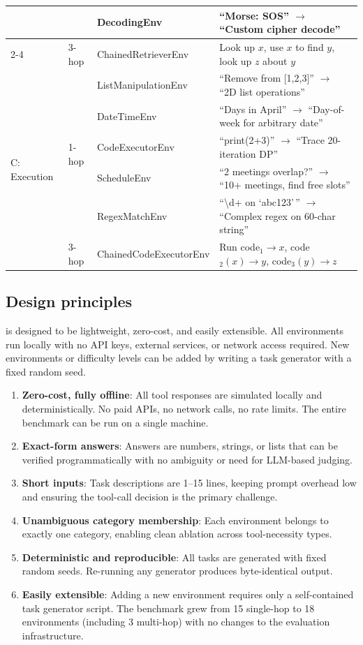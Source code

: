 \begin{table}[H]
\begin{tabular}{lllp{6.5cm}}
  & & DecodingEnv & ``Morse: SOS'' $\to$ ``Custom cipher decode'' \\
  \cmidrule(lr){2-4}
  & 3-hop & ChainedRetrieverEnv & Look up $x$, use $x$ to find $y$, look up $z$ about $y$ \\
\midrule
\multirow{6}{*}{C: Execution}
  & \multirow{5}{*}{1-hop} & ListManipulationEnv & ``Remove from [1,2,3]'' $\to$ ``2D list operations'' \\
  & & DateTimeEnv & ``Days in April'' $\to$ ``Day-of-week for arbitrary date'' \\
  & & CodeExecutorEnv & ``print(2+3)'' $\to$ ``Trace 20-iteration DP'' \\
  & & ScheduleEnv & ``2 meetings overlap?'' $\to$ ``10+ meetings, find free slots'' \\
  & & RegexMatchEnv & ``\textbackslash d+ on `abc123'\,'' $\to$ ``Complex regex on 60-char string'' \\
  \cmidrule(lr){2-4}
  & 3-hop & ChainedCodeExecutorEnv & Run code$_1 \to x$, code$_2(x) \to y$, code$_3(y) \to z$ \\
\bottomrule
\end{tabular}
\end{table}

\subsection{Design principles}

\benchmark{} is designed to be lightweight, zero-cost, and easily extensible. All environments run locally with no API keys, external services, or network access required. New environments or difficulty levels can be added by writing a task generator with a fixed random seed.

\begin{enumerate}
    \item \textbf{Zero-cost, fully offline}: All tool responses are simulated locally and deterministically. No paid APIs, no network calls, no rate limits. The entire benchmark can be run on a single machine.
    \item \textbf{Exact-form answers}: Answers are numbers, strings, or lists that can be verified programmatically with no ambiguity or need for LLM-based judging.
    \item \textbf{Short inputs}: Task descriptions are 1--15 lines, keeping prompt overhead low and ensuring the tool-call decision is the primary challenge.
    \item \textbf{Unambiguous category membership}: Each environment belongs to exactly one category, enabling clean ablation across tool-necessity types.
    \item \textbf{Deterministic and reproducible}: All tasks are generated with fixed random seeds. Re-running any generator produces byte-identical output.
    \item \textbf{Easily extensible}: Adding a new environment requires only a self-contained task generator script. The benchmark grew from 15 single-hop to 18 environments (including 3 multi-hop) with no changes to the evaluation infrastructure.
\end{enumerate}

